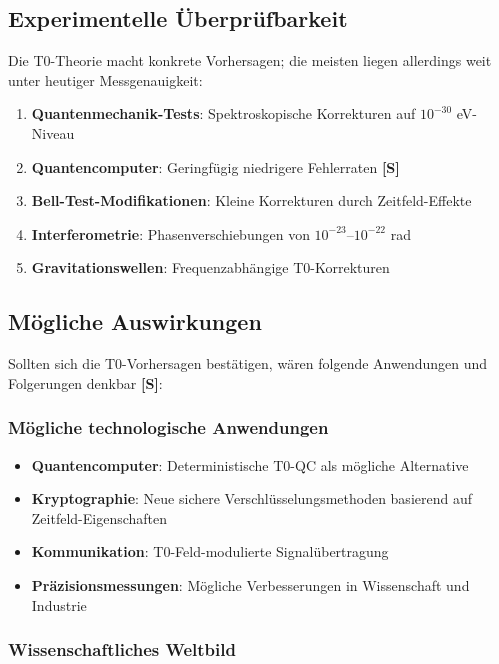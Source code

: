 	\subsection{Experimentelle Überprüfbarkeit}
	
	Die T0-Theorie macht konkrete Vorhersagen; die meisten liegen allerdings weit unter heutiger Messgenauigkeit:
	
	\begin{enumerate}
		\item \textbf{Quantenmechanik-Tests}: Spektroskopische Korrekturen auf $10^{-30}$ eV-Niveau
		\item \textbf{Quantencomputer}: Geringfügig niedrigere Fehlerraten \textbf{[S]}
		\item \textbf{Bell-Test-Modifikationen}: Kleine Korrekturen durch Zeitfeld-Effekte
		\item \textbf{Interferometrie}: Phasenverschiebungen von $10^{-23}$--$10^{-22}$ rad
		\item \textbf{Gravitationswellen}: Frequenzabhängige T0-Korrekturen
	\end{enumerate}
	
	\subsection{Mögliche Auswirkungen}
	
	Sollten sich die T0-Vorhersagen bestätigen, wären folgende Anwendungen und Folgerungen denkbar \textbf{[S]}:
	
	\subsubsection{Mögliche technologische Anwendungen}
	
	\begin{itemize}
		\item \textbf{Quantencomputer}: Deterministische T0-QC als mögliche Alternative
		\item \textbf{Kryptographie}: Neue sichere Verschlüsselungsmethoden basierend auf Zeitfeld-Eigenschaften
		\item \textbf{Kommunikation}: T0-Feld-modulierte Signalübertragung
		\item \textbf{Präzisionsmessungen}: Mögliche Verbesserungen in Wissenschaft und Industrie
	\end{itemize}
	
	\subsubsection{Wissenschaftliches Weltbild}
	
